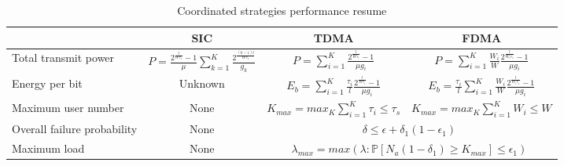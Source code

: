 \begin{table*}[!th]
	\centering
	\caption{Coordinated strategies performance resume}
	\label{tab:coordinated-performance-resume}
	\begin{tabular}{lccc}
		\midrule
		& SIC                                                                                         & TDMA                                                                        & FDMA                                                                                       \\ \midrule
		Total transmit power        & $P=\frac{2^{\frac{l}{W\tau_s}}-1}{\mu}\sum_{k=1}^{K}\frac{2^{\frac{(k-1)l}{W\tau_s}}}{g_k}$ & $P=\sum_{i=1}^{K}\frac{2^{\frac{l}{W\tau_i}}-1}{\mu g_i}$                   & $P=\sum_{i=1}^{K}\frac{W_i}{W}\frac{2^{\frac{l}{W_i\tau_s}}-1}{\mu g_i}$                   \\ \midrule
		Energy per bit              & Unknown                                                                                     & $E_b=\sum_{i=1}^{K}\frac{\tau_i}{l}\frac{2^{\frac{l}{W\tau_i}}-1}{\mu g_i}$ & $E_b=\frac{\tau_i}{l}\sum_{i=1}^{K}\frac{W_i}{W}\frac{2^{\frac{l}{W_i\tau_s}}-1}{\mu g_i}$ \\ \midrule
		Maximum user number         & None                                                                                        & $K_{max} = max_{K}\sum_{i=1}^{K}\tau_i \leq \tau_s$                         &      $K_{max} = max_{K}\sum_{i=1}^{K}W_i \leq W$                                                                                      \\ \midrule
		Overall failure probability & None                                                                                        & \multicolumn{2}{c}{$\delta \leq \epsilon+ \delta_1 (1- \epsilon_1)$}                                                                                                     \\ \midrule
		Maximum load                & None                                                                                        & \multicolumn{2}{c}{$\lambda_{max} =max(\lambda: \mathbb{P}\left[N_a(1-\delta_1) \geq K_{max} \right] \leq \epsilon_1 )$}                                                 \\ \bottomrule
	\end{tabular}
\end{table*}

